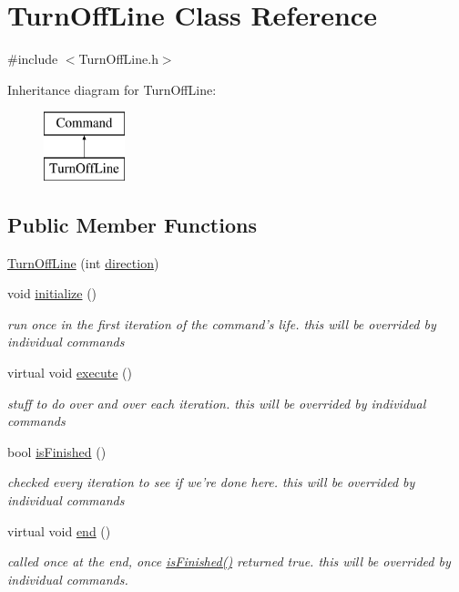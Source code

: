 \hypertarget{classTurnOffLine}{\section{Turn\-Off\-Line Class Reference}
\label{classTurnOffLine}
}


{\ttfamily \#include $<$Turn\-Off\-Line.\-h$>$}

Inheritance diagram for Turn\-Off\-Line\-:\begin{figure}[H]
\begin{center}
\leavevmode
\includegraphics[height=2.000000cm]{classTurnOffLine}
\end{center}
\end{figure}
\subsection*{Public Member Functions}
\begin{DoxyCompactItemize}
\item 
\hyperlink{classTurnOffLine_a646faf11da687b4ed4330c6248b6e99e}{Turn\-Off\-Line} (int \hyperlink{classTurnOffLine_a7f229d3b3f2e9707b550affb60e7a71a}{direction})
\item 
void \hyperlink{classTurnOffLine_a4072817ff86f237d276a430e56e912a3}{initialize} ()
\begin{DoxyCompactList}\small\item\em run once in the first iteration of the command's life. this will be overrided by individual commands \end{DoxyCompactList}\item 
virtual void \hyperlink{classTurnOffLine_a9897de245832cd3ee74edc35b342fc03}{execute} ()
\begin{DoxyCompactList}\small\item\em stuff to do over and over each iteration. this will be overrided by individual commands \end{DoxyCompactList}\item 
bool \hyperlink{classTurnOffLine_ad924499a6bc07a7331222e9b4aba3517}{is\-Finished} ()
\begin{DoxyCompactList}\small\item\em checked every iteration to see if we're done here. this will be overrided by individual commands \end{DoxyCompactList}\item 
virtual void \hyperlink{classTurnOffLine_ad888d865fb75e8139825f4dcf7709f1e}{end} ()
\begin{DoxyCompactList}\small\item\em called once at the end, once \hyperlink{classTurnOffLine_ad924499a6bc07a7331222e9b4aba3517}{is\-Finished()} returned true. this will be overrided by individual commands. \end{DoxyCompactList}\end{DoxyCompactItemize}
